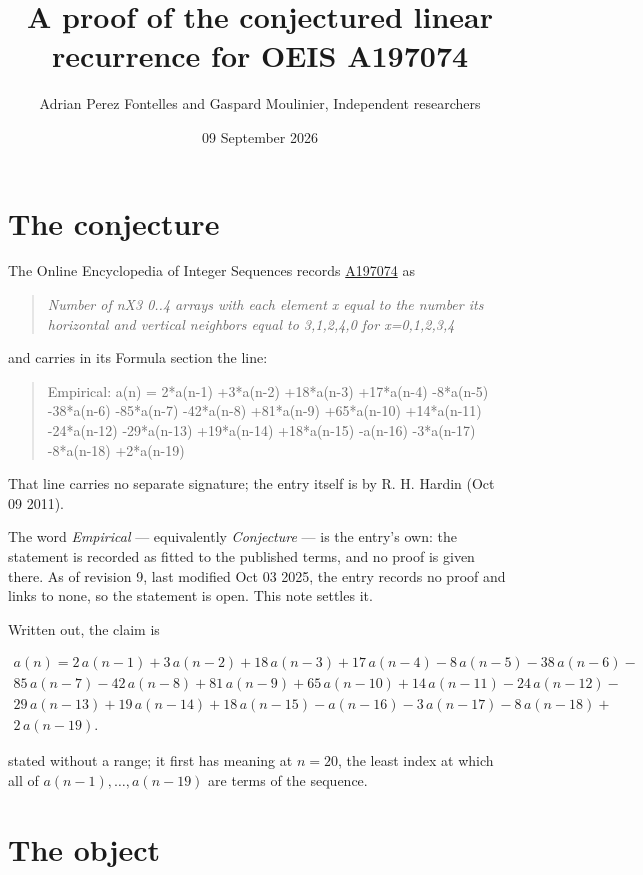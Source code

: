 \documentclass[11pt]{article}
\title{A proof of the conjectured linear recurrence for OEIS A197074}
\author{Adrian Perez Fontelles and Gaspard Moulinier, Independent researchers}
\date{09 September 2026}
\theoremstyle{definition}
\begin{document}
\maketitle
\section{The conjecture}

The Online Encyclopedia of Integer Sequences records \href{https://oeis.org/A197074}{A197074} as

\begin{quote}\itshape Number of nX3 0..4 arrays with each element x equal to the number its horizontal and vertical neighbors equal to 3,1,2,4,0 for x=0,1,2,3,4\end{quote}

and carries in its Formula section the line:

\begin{quote}\ttfamily Empirical: a(n) = 2*a(n-1) +3*a(n-2) +18*a(n-3) +17*a(n-4) -8*a(n-5) -38*a(n-6) -85*a(n-7) -42*a(n-8) +81*a(n-9) +65*a(n-10) +14*a(n-11) -24*a(n-12) -29*a(n-13) +19*a(n-14) +18*a(n-15) -a(n-16) -3*a(n-17) -8*a(n-18) +2*a(n-19)\end{quote}

That line carries no separate signature; the entry itself is by R. H. Hardin (Oct 09 2011).

The word {\itshape Empirical} --- equivalently {\itshape Conjecture} --- is the entry's own: the statement is recorded as fitted to the published terms, and no proof is given there. As of revision 9, last modified Oct 03 2025, the entry records no proof and links to none, so the statement is open. This note settles it.

Written out, the claim is

\begin{multline*} a(n) = 2\,a(n-1) + 3\,a(n-2) + 18\,a(n-3) + 17\,a(n-4) - 8\,a(n-5) - 38\,a(n-6) - \\ 85\,a(n-7) - 42\,a(n-8) + 81\,a(n-9) + 65\,a(n-10) + 14\,a(n-11) - 24\,a(n-12) - \\ 29\,a(n-13) + 19\,a(n-14) + 18\,a(n-15) - a(n-16) - 3\,a(n-17) - 8\,a(n-18) + \\ 2\,a(n-19). \end{multline*}

stated without a range; it first has meaning at $n = 20$, the least index at which all of $a(n-1),\dots,a(n-19)$ are terms of the sequence.

\section{The object}
\end{document}
